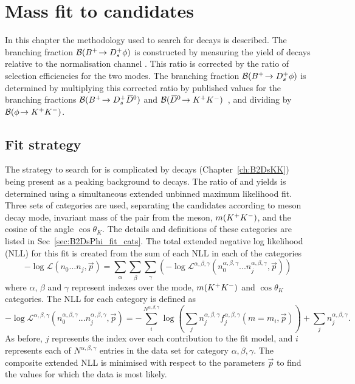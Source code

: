\chapter{Mass fit to \decay{\Bp}{\Dsp\phiz} candidates} 
\label{ch:B2DsPhi}

\minitoc

In this chapter the methodology used to search for \decay{\Bp}{\Dsp\phiz} decays is described.
The branching fraction ${\mathcal{B}}({{{B}^+}}\!\rightarrow {\ensuremath{{D}^+_{s}}}\phi)$ is constructed by measuring the yield of \decay{\Bp}{\Dsp\phiz} decays relative to the normalisation channel \decay{\Bp}{\Dsp\Dzb}. This ratio is corrected by the ratio of selection efficiencies for the two modes. 
The branching fraction ${\mathcal{B}}({{{B}^+}}\!\rightarrow {\ensuremath{{D}^+_{s}}}\phi)$ is determined by multiplying this corrected ratio by published values for the branching fractions ${\mathcal{B}}({{{B}^+}}\!\rightarrow {\ensuremath{{D}^+_{s}}}{\ensuremath{{\kern 0.2em\overline{\kern -0.2em D}{}}{}^0}})$ and ${\mathcal{B}}({{\kern 0.2em\overline{\kern -0.2em D}{}}{}^0}\!\rightarrow {\ensuremath{{K}^+}}{\ensuremath{{K}^-}})$~\cite{PDG2016}, and dividing by ${\mathcal{B}}(\phi\!\rightarrow {\ensuremath{{K}^+}}{\ensuremath{{K}^-}})$. 


\section{Fit strategy}
\label{sec:B2DsPhi_fitstrategy}
The strategy to search for \decay{\Bp}{\Dsp\phiz} is complicated by \decay{\Bp}{\Dsp\Kp\Km} decays (Chapter~\ref{ch:B2DsKK}) being present as a peaking background to \decay{\Bp}{\Dsp(\decay{\phiz}{\Kp\Km})} decays.
The ratio of \decay{\Bp}{\Dsp\phiz} and \decay{\Bp}{\Dsp\Dzb} yields is determined using a simultaneous extended unbinned maximum likelihood fit. Three sets of categories are used, separating the candidates according to \Dsp meson decay mode, invariant mass of the \Kp\Km pair from the \phiz meson, $m({{K}^+}{{K}^-})$, and the cosine of the angle $\cos\theta_{K}$. The details and definitions of these categories are listed in Sec~\ref{sec:B2DsPhi_fit_cats}. 
The total extended negative log likelihood (NLL) for this fit is created from the sum of each NLL in each of the categories
\begin{equation}
-\log\mathcal{L}(n_{0}...n_{j},\vec{p}) = \sum_{\alpha} \sum_{\beta} \sum_{\gamma} \left(-\log\mathcal{L^{\alpha,\beta,\gamma}}(n_{0}^{\alpha,\beta,\gamma}...n_{j}^{\alpha,\beta,\gamma},\vec{p}) \right)
\end{equation} 
where $\alpha$, $\beta$ and $\gamma$ represent indexes over the \Dsp mode, $m({{K}^+}{{K}^-})$ and $\cos\theta_{K}$ categories.
The NLL for each category is defined as
\begin{equation}
-\log\mathcal{L^{\alpha,\beta,\gamma}}(n_{0}^{\alpha,\beta,\gamma}...n_{j}^{\alpha,\beta,\gamma},\vec{p}) = -\sum_{i}^{N^{\alpha,\beta,\gamma}} \log \left( \sum_{j} n_{j}^{\alpha,\beta,\gamma} f_{j}^{\alpha,\beta,\gamma}(m=m_{i},\vec{p}) \right) + \sum_{j}n_{j}^{\alpha,\beta,\gamma}.
\end{equation} 
As before, $j$ represents the index over each contribution to the fit model, and $i$ represents each of $N^{\alpha,\beta,\gamma}$ entries in the data set for category $\alpha,\beta,\gamma$. 
The composite extended NLL is minimised with respect to the parameters $\vec{p}$ to find the values for which the data is most likely.

